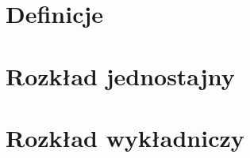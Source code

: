 \section{Definicje}


\newpage
\section{Rozkład jednostajny}


\newpage
\section{Rozkład wykładniczy}

